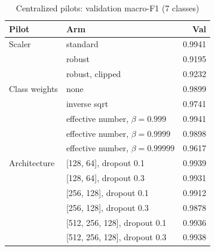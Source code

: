 \begin{table}[h]
\centering
\caption{Centralized pilots: validation macro-F1 (7 classes)} %
\label{tab:pilots}
\footnotesize
\begin{tabular}{@{}llr@{}}
\toprule
Pilot & Arm & Val\\
\midrule
Scaler & standard & 0.9941\\ %
 & robust & 0.9195\\ %
 & robust, clipped & 0.9232\\ %
Class weights & none & 0.9899\\ %
 & inverse sqrt & 0.9741\\ %
 & effective number, $\beta=0.999$ & 0.9941\\ %
 & effective number, $\beta=0.9999$ & 0.9898\\ %
 & effective number, $\beta=0.99999$ & 0.9617\\ %
Architecture & [128, 64], dropout 0.1 & 0.9939\\ %
 & [128, 64], dropout 0.3 & 0.9931\\ %
 & [256, 128], dropout 0.1 & 0.9912\\ %
 & [256, 128], dropout 0.3 & 0.9878\\ %
 & [512, 256, 128], dropout 0.1 & 0.9936\\ %
 & [512, 256, 128], dropout 0.3 & 0.9938\\ %
\bottomrule
\end{tabular}
\end{table}

